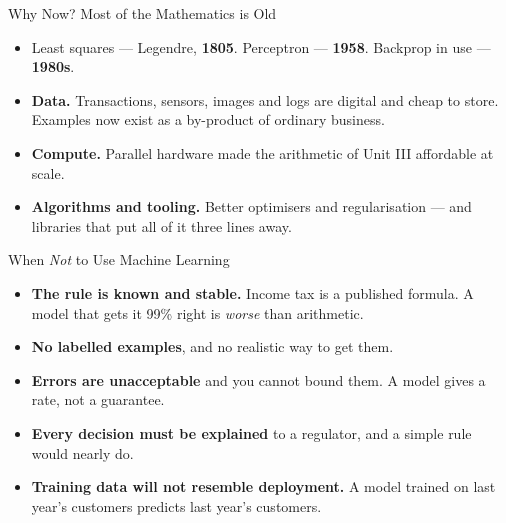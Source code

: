 \documentclass[aspectratio=169]{beamer}
\begin{document}
\begin{frame}[shrink=8]{Why Now? Most of the Mathematics is Old}
  \begin{itemize}[<+->]
    \item Least squares --- Legendre, \textbf{1805}. \quad Perceptron --- \textbf{1958}. \quad Backprop in use --- \textbf{1980s}.
    \item \textbf{Data.} Transactions, sensors, images and logs are digital and cheap to store. Examples now exist as a by-product of ordinary business.
    \item \textbf{Compute.} Parallel hardware made the arithmetic of Unit III affordable at scale.
    \item \textbf{Algorithms and tooling.} Better optimisers and regularisation --- and libraries that put all of it three lines away.
  \end{itemize}
  \vspace{0.3em}
\end{frame}

\begin{frame}[shrink=6]{When \emph{Not} to Use Machine Learning}
  \begin{itemize}[<+->]
    \item \textbf{The rule is known and stable.} Income tax is a published formula. A model that gets it 99\% right is \emph{worse} than arithmetic.
    \item \textbf{No labelled examples}, and no realistic way to get them.
    \item \textbf{Errors are unacceptable} and you cannot bound them. A model gives a rate, not a guarantee.
    \item \textbf{Every decision must be explained} to a regulator, and a simple rule would nearly do.
    \item \textbf{Training data will not resemble deployment.} A model trained on last year's customers predicts last year's customers.
  \end{itemize}
  \vspace{0.2em}
\end{frame}
\end{document}
